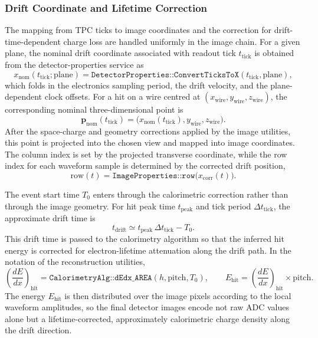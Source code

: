 \subsubsection{Drift Coordinate and Lifetime Correction}

The mapping from TPC ticks to image coordinates and the correction for
drift-time-dependent charge loss are handled uniformly in the image chain. For a
given plane, the nominal drift coordinate associated with readout tick
\(t_{\mathrm{tick}}\) is obtained from the detector-properties service as
\begin{equation}
  x_{\mathrm{nom}}(t_{\mathrm{tick}};\mathrm{plane})
  =
  \texttt{DetectorProperties::ConvertTicksToX}(t_{\mathrm{tick}},\mathrm{plane}),
  \label{eq:ch3-convert-ticks-to-x}
\end{equation}
which folds in the electronics sampling period, the drift velocity, and the
plane-dependent clock offsets. For a hit on a wire centred at
\((x_{\mathrm{wire}},y_{\mathrm{wire}},z_{\mathrm{wire}})\), the corresponding
nominal three-dimensional point is
\begin{equation}
  \mathbf p_{\mathrm{nom}}(t_{\mathrm{tick}})
  =
  \bigl(x_{\mathrm{nom}}(t_{\mathrm{tick}}),y_{\mathrm{wire}},z_{\mathrm{wire}}\bigr).
\end{equation}
After the space-charge and geometry corrections applied by the image utilities,
this point is projected into the chosen view and mapped into image coordinates.
The column index is set by the projected transverse coordinate, while the row
index for each waveform sample is determined by the corrected drift position,
\begin{equation}
  \mathrm{row}(t)
  =
  \texttt{ImageProperties::row}\bigl(x_{\mathrm{corr}}(t)\bigr).
  \label{eq:ch3-image-row}
\end{equation}

The event start time \(T_0\) enters through the calorimetric correction rather
than through the image geometry. For hit peak time \(t_{\mathrm{peak}}\) and
tick period \(\Delta t_{\mathrm{tick}}\), the approximate drift time is
\begin{equation}
  t_{\mathrm{drift}}
  \simeq
  t_{\mathrm{peak}}\,\Delta t_{\mathrm{tick}} - T_0.
  \label{eq:ch3-drift-time}
\end{equation}
This drift time is passed to the calorimetry algorithm so that the inferred hit
energy is corrected for electron-lifetime attenuation along the drift path. In
the notation of the reconstruction utilities,
\begin{equation}
  \left(\frac{dE}{dx}\right)_{\mathrm{hit}}
  =
  \texttt{CalorimetryAlg::dEdx\_AREA}(h,\mathrm{pitch},T_0),
  \qquad
  E_{\mathrm{hit}}
  =
  \left(\frac{dE}{dx}\right)_{\mathrm{hit}}\times \mathrm{pitch}.
  \label{eq:ch3-hit-energy}
\end{equation}
The energy \(E_{\mathrm{hit}}\) is then distributed over the image pixels
according to the local waveform amplitudes, so the final detector images encode
not raw ADC values alone but a lifetime-corrected, approximately calorimetric
charge density along the drift direction.


